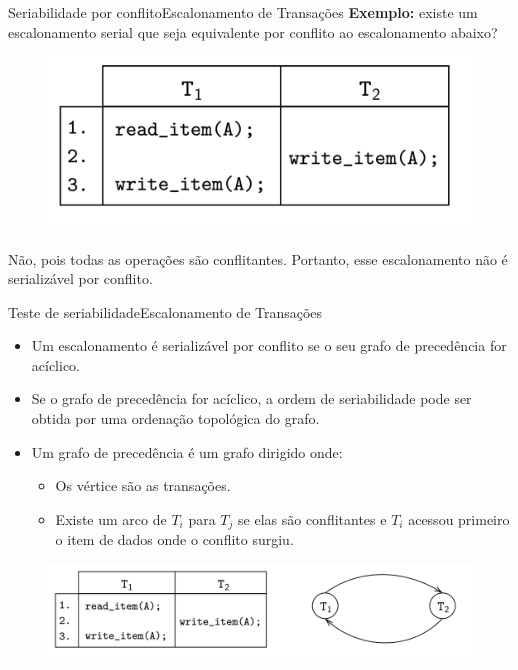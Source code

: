 \documentclass[t]{beamer}
\begin{document}
\begin{ftst}{Seriabilidade por conflito}{Escalonamento de Transações}
\textbf{Exemplo:} existe um escalonamento serial que seja equivalente por conflito ao escalonamento abaixo?

\begin{figure}
    \centering
    \includegraphics[scale=0.13]{Figuras_transacoes/16.png}
\end{figure}
\small
Não, pois todas as operações são conflitantes. Portanto, esse escalonamento não é serializável por conflito.
\end{ftst}


\begin{ftst}{Teste de seriabilidade}{Escalonamento de Transações}

\begin{itemize}
    \item Um escalonamento é serializável por conflito se o seu grafo de precedência for acíclico.
    \item Se o grafo de precedência for acíclico, a ordem de seriabilidade pode ser obtida por uma ordenação topológica do grafo.
    \item Um grafo de precedência é um grafo dirigido onde:
    \begin{itemize}
        \item Os vértice são as transações.
        \item Existe um arco de $T_i$ para $T_j$ se elas são conflitantes e $T_i$ acessou primeiro o item de dados onde o conflito surgiu.
    \end{itemize}
\end{itemize}
\begin{figure}
    \centering
    \includegraphics[scale=0.13]{Figuras_transacoes/17.png}
\end{figure}
\end{ftst}
\end{document}
